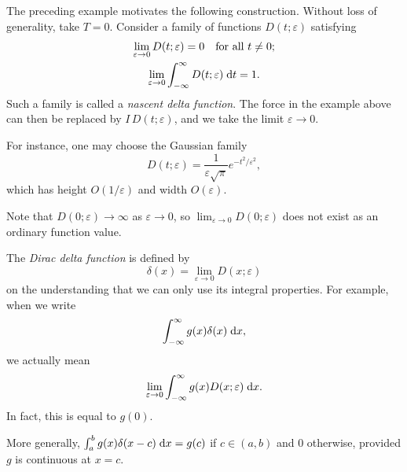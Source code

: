 \documentclass[a4paper]{article}
\begin{document}
\begin{remark}
  The preceding example motivates the following construction. Without loss of generality, take $T = 0$. Consider a family of functions $D(t; \varepsilon)$ satisfying
  \begin{gather*}
    \lim_{\varepsilon\to 0} D(t; \varepsilon) = 0 \quad\text{for all }t \neq 0;\\
    \lim_{\varepsilon\to 0}\int_{-\infty}^\infty D(t; \varepsilon) \;\mathrm{d} t = 1.
  \end{gather*}
  Such a family is called a \emph{nascent delta function}. The force in the example above can then be replaced by $I\,D(t; \varepsilon)$, and we take the limit $\varepsilon \to 0$.

  For instance, one may choose the Gaussian family
  \[
    D(t; \varepsilon) = \frac{1}{\varepsilon\sqrt{\pi}}e^{-t^2/\varepsilon^2},
  \]
  which has height $O(1/\varepsilon)$ and width $O(\varepsilon)$.
  \begin{center}
  \end{center}
  Note that $D(0; \varepsilon) \to \infty$ as $\varepsilon \to 0$, so $\lim_{\varepsilon\to 0} D(0; \varepsilon)$ does not exist as an ordinary function value.
\end{remark}

\begin{defi}
  The \emph{Dirac delta function} is defined by
  \[
    \delta(x) = \lim_{\varepsilon \to 0} D(x; \varepsilon)
  \]
  on the understanding that we can only use its integral properties. For example, when we write
  \[
    \int_{-\infty}^{\infty} g(x)\delta (x) \;\mathrm{d} x,
  \]
  we actually mean
  \[
    \lim_{\varepsilon \to 0} \int_{-\infty}^{\infty} g(x)D(x; \varepsilon)\;\mathrm{d} x.
  \]
  In fact, this is equal to $g(0)$.

  More generally, $\int_a^b g(x)\delta(x - c)\;\mathrm{d} x = g(c)$ if $c\in (a, b)$ and $0$ otherwise, provided $g$ is continuous at $x = c$.
\end{defi}
\end{document}
